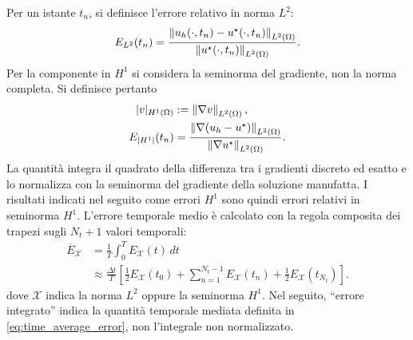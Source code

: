 Per un istante $t_n$, si definisce l'errore relativo in norma $L^2$:
\begin{equation}
E_{L^2}(t_n)=
\frac{\left\lVert u_h(\cdot,t_n)-u^\star(\cdot,t_n) \right\rVert_{L^2(\Omega)}}
{\left\lVert u^\star(\cdot,t_n) \right\rVert_{L^2(\Omega)}}.
\label{eq:rel_l2}
\end{equation}
Per la componente in $H^1$ si considera la seminorma del gradiente, non la norma completa. Si definisce pertanto
\begin{equation}
\begin{aligned}
|v|_{H^1(\Omega)}&:=\left\lVert \nabla v \right\rVert_{L^2(\Omega)},\\
E_{|H^1|}(t_n)&=
\frac{\left\lVert \nabla(u_h-u^\star) \right\rVert_{L^2(\Omega)}}
{\left\lVert \nabla u^\star \right\rVert_{L^2(\Omega)}}.
\end{aligned}
\label{eq:rel_h1}
\end{equation}
La quantità integra il quadrato della differenza tra i gradienti discreto ed esatto e lo normalizza con la seminorma del gradiente della soluzione manufatta. I risultati indicati nel seguito come errori $H^1$ sono quindi errori relativi in seminorma $H^1$.
L'errore temporale medio è calcolato con la regola composita dei trapezi sugli $N_t+1$ valori temporali:
\begin{equation}
\begin{aligned}
\overline E_{\mathcal X}
&=\frac{1}{T}\int_0^T E_{\mathcal X}(t)\,dt\\
&\approx\frac{\Delta t}{T}\left[
\frac12 E_{\mathcal X}(t_0)
+\sum_{n=1}^{N_t-1}E_{\mathcal X}(t_n)
+\frac12E_{\mathcal X}(t_{N_t})\right].
\end{aligned}
\label{eq:time_average_error}
\end{equation}
dove $\mathcal X$ indica la norma $L^2$ oppure la seminorma $H^1$. Nel seguito, ``errore integrato'' indica la quantità temporale mediata definita in \eqref{eq:time_average_error}, non l'integrale non normalizzato.
